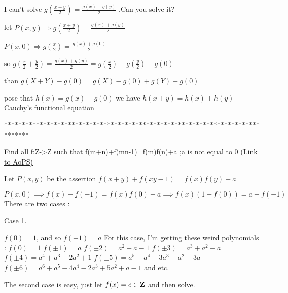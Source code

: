 \begin{solution}
	\begin{tcolorbox}I can't solve  $g(\frac{x+y}2)=\frac{g(x)+g(y)}2$ .Can you solve it?\end{tcolorbox}

let $P(x,y) \Rightarrow g(\frac{x+y}2)=\frac{g(x)+g(y)}2$

$P(x,0) \Rightarrow g(\frac{x}2)=\frac{g(x)+g(0)}2$

so $g(\frac{x}2+\frac{y}2)=\frac{g(x)+g(y)}2=g(\frac{x}2)+g(\frac{y}2)-g(0)$

than $g(X+Y)-g(0)=g(X)-g(0)+g(Y)-g(0)$

pose that $h(x)=g(x)-g(0)$ we have $h(x+y)=h(x)+h(y)$ Cauchy's functional equation
\end{solution}
*******************************************************************************
-------------------------------------------------------------------------------

\begin{problem}
	Find all f:Z->Z such that
f(m+n)+f(mn-1)=f(m)f(n)+a ;a is not equal to 0
	\flushright \href{https://artofproblemsolving.com/community/c6h573996}{(Link to AoPS)}
\end{problem}



\begin{solution}
	Let $P(x,y)$ be the assertion $f(x+y)+f(xy-1)=f(x)f(y)+a$

$P(x,0)\implies f(x)+f(-1)=f(x)f(0)+a\implies f(x)(1-f(0))=a-f(-1)$
There are two cases :

\begin{bolded}Case 1.\end{bolded} $f(0)=1$, and so $f(-1)=a$
For this case, I'm getting these weird polynomials :
$f(0)=1$
$f(\pm 1)=a$
$f(\pm 2)=a^2+a-1$
$f(\pm 3)=a^3+a^2-a$
$f(\pm 4)=a^4+a^3-2a^2+1$
$f(\pm 5)=a^5+a^4-3a^3-a^2+3a$
$f(\pm 6)=a^6+a^5-4a^4-2a^3+5a^2+a-1$
and etc.

The second case is easy, just let $f(x)=c\in \bf Z$ and then solve.
\end{solution}



